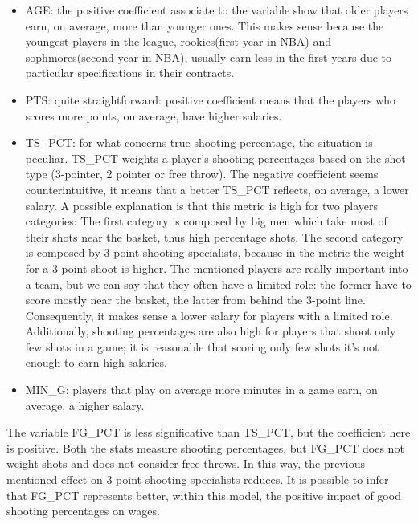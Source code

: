 \documentclass[
]{article}
\begin{document}
\begin{itemize}
\item
  AGE: the positive coefficient associate to the variable show that
  older players earn, on average, more than younger ones. This makes
  sense because the youngest players in the league, rookies(first year
  in NBA) and sophmores(second year in NBA), usually earn less in the
  first years due to particular specifications in their contracts.
\item
  PTS: quite straightforward: positive coefficient means that the
  players who scores more points, on average, have higher salaries.
\item
  TS\_PCT: for what concerns true shooting percentage, the situation is
  peculiar. TS\_PCT weights a player's shooting percentages based on the
  shot type (3-pointer, 2 pointer or free throw). The negative
  coefficient seems counterintuitive, it means that a better TS\_PCT
  reflects, on average, a lower salary. A possible explanation is that
  this metric is high for two players categories: The first category is
  composed by big men which take most of their shots near the basket,
  thus high percentage shots. The second category is composed by 3-point
  shooting specialists, because in the metric the weight for a 3 point
  shoot is higher. The mentioned players are really important into a
  team, but we can say that they often have a limited role: the former
  have to score mostly near the basket, the latter from behind the
  3-point line. Consequently, it makes sense a lower salary for players
  with a limited role. Additionally, shooting percentages are also high
  for players that shoot only few shots in a game; it is reasonable that
  scoring only few shots it's not enough to earn high salaries.
\item
  MIN\_G: players that play on average more minutes in a game earn, on
  average, a higher salary.
\end{itemize}

The variable FG\_PCT is less significative than TS\_PCT, but the
coefficient here is positive. Both the stats measure shooting
percentages, but FG\_PCT does not weight shots and does not consider
free throws. In this way, the previous mentioned effect on 3 point
shooting specialists reduces. It is possible to infer that FG\_PCT
represents better, within this model, the positive impact of good
shooting percentages on wages.
\end{document}
